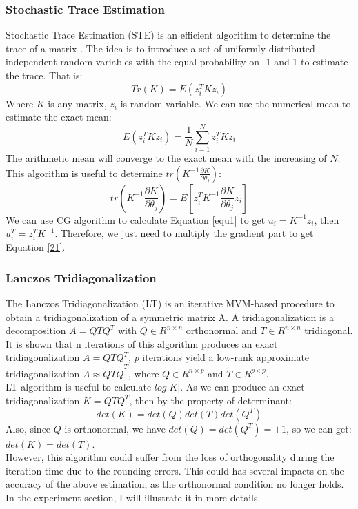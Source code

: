 \documentclass{article}
\begin{document}
\subsubsection{Stochastic Trace Estimation}
Stochastic Trace Estimation (STE) is an efficient algorithm to determine the trace of a matrix \cite{12}. The idea is to introduce a set of uniformly distributed independent random variables with the equal probability on -1 and 1 to estimate the trace. That is:
\begin{equation}
Tr(K)=E(z_i^TKz_i)
\end{equation}
Where $K$ is any matrix, $z_i$ is random variable. We can use the numerical mean to estimate the exact mean:
\begin{equation}
E(z_i^TKz_i)=\frac{1}{N}\sum_{i=1}^{N}z_i^TKz_i
\end{equation}
The arithmetic mean will converge to the exact mean with the increasing of $N$. This algorithm is useful to determine $tr(K^{-1}\frac{\partial K}{\partial \theta_j})$:
\begin{equation} \label{21}
tr(K^{-1}\frac{\partial K}{\partial \theta_j})=E[z_i^TK^{-1}\frac{\partial K}{\partial \theta_j}z_i]
\end{equation}
We can use CG algorithm to calculate Equation \ref{equ1} to get $u_i=K^{-1}z_i$, then $u_i^T=z_i^TK^{-1}$. Therefore, we just need to multiply the gradient part to get Equation \ref{21}.
\subsubsection{Lanczos Tridiagonalization}
The Lanczos Tridiagonalization (LT) \cite{13} is an iterative MVM-based procedure to obtain a tridiagonalization of a symmetric matrix A. A tridiagonalization is a decomposition $A=QTQ^T$ with $Q\in R^{n\times n}$ orthonormal and $T\in R^{n\times n}$ tridiagonal. It is shown that n iterations of this algorithm produces an exact tridiagonalization $A=QTQ^T$, $p$ iterations yield a low-rank approximate tridiagonalization $A\approx \tilde{Q}\tilde{T}\tilde{Q}^T$, where $\tilde{Q} \in R^{n\times p}$ and $\tilde{T}\in R^{p\times p}$. \\
LT algorithm is useful to calculate $log|K|$. As we can produce an exact tridiagonalization $K=QTQ^T$, then by the property of determinant:
\begin{equation}
det(K)=det(Q)det(T)det(Q^T)
\end{equation}
Also, since $Q$ is orthonormal, we have $det(Q)=det(Q^T)=\pm 1$, so we can get: $det(K)=det(T)$.\\
However, this algorithm could suffer from the loss of orthogonality during the iteration time due to the rounding errors. This could has several impacts on the accuracy of the above estimation, as the orthonormal condition no longer holds. In the experiment section, I will illustrate it in more details.
\end{document}
